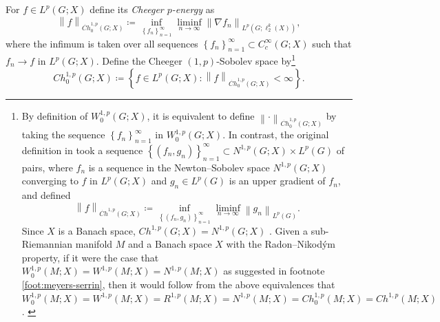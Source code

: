 \documentclass[11pt,reqno]{amsart}
\newcommand{\1}{\mathbf 1}
\begin{document}
For $f\in L^{p}\left(G;X\right)$ define its \emph{Cheeger $p$-energy} as
\[
\left\|f\right\|_{\dot{Ch}_0^{1,p}\left(G;X\right)}\coloneqq \inf_{\left\{f_n\right\}_{n=1}^\infty} \liminf_{n\to\infty}\left\|\nabla f_n\right\|_{L^p\left(G;\ell_2^k\left(X\right)\right)},
\]
where the infimum is taken over all sequences $\left\{f_n\right\}_{n=1}^\infty\subset C_c^\infty\left(G;X\right)$ such that $f_n\to f$ in $L^p\left(G;X\right)$. Define the Cheeger $\left(1,p\right)$-Sobolev space by\footnote{By definition of $W_0^{1,p}\left(G;X\right)$, it is equivalent to define $\left\|\cdot\right\|_{\dot{Ch}_0^{1,p}\left(G;X\right)}$ by taking the sequence $\left\{f_n\right\}_{n=1}^\infty$ in $W_0^{1,p}\left(G;X\right)$. In contrast, the original definition in \cite{cheeger1999differentiability} took a sequence $\left\{\left(f_n,g_n\right)\right\}_{n=1}^\infty\subset N^{1,p}\left(G;X\right)\times L^p\left(G\right)$ of pairs, where $f_n$ is a sequence in the Newton--Sobolev space $N^{1,p}\left(G;X\right)$ converging to $f$ in $L^p\left(G;X\right)$ and $g_n\in L^p\left(G\right)$ is an upper gradient of $f_n$, and defined
\[
\left\| f\right\|_{\dot{Ch}^{1,p}\left(G;X\right)}\coloneqq \inf_{\left\{\left(f_n,g_n\right)\right\}_{n=1}^\infty} \liminf_{n\to\infty}\left\|g_n\right\|_{L^p\left(G\right)}.
\]
Since $X$ is a Banach space, $Ch^{1,p}\left(G;X\right)=N^{1,p}\left(G;X\right)$ \cite[Theorem 10.1.1]{heinonen2015sobolev}. Given a sub-Riemannian manifold $M$ and a Banach space $X$ with the Radon--Nikod\'ym property, if it were the case that $W_0^{1,p}\left(M;X\right)=W^{1,p}\left(M;X\right)=N^{1,p}\left(M;X\right)$ as suggested in footnote \ref{foot:meyers-serrin}, then it would follow from the above equivalences that $W_0^{1,p}\left(M;X\right)=W^{1,p}\left(M;X\right)=R^{1,p}\left(M;X\right)=N^{1,p}\left(M;X\right)=Ch_0^{1,p}\left(M;X\right)=Ch^{1,p}\left(M;X\right)$.
\label{foot:Cheeger}}
\[
Ch_0^{1,p}\left(G;X\right)\coloneqq \left\{f\in L^p\left(G;X\right):\left\|f\right\|_{\dot{Ch}_0^{1,p}\left(G;X\right)}<\infty\right\}.
\]
\end{document}
